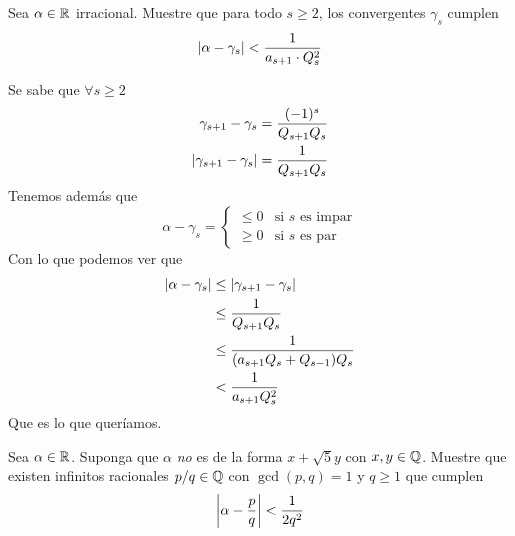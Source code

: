 \begin{prob}[5 pts.]
	Sea $\alpha\in\mathbb{R}$ irracional. Muestre que para todo $s\geq 2$, los convergentes $\gamma_s$ cumplen
	\[
		\left|\alpha-\gamma_s\right|<\frac{1}{a_{s+1}\cdot Q_s^2}
	\]
\end{prob}

\begin{sol}
	Se sabe que $\forall s\geq2$
	\begin{align*}
		\gamma_{s+1}-\gamma_s=\frac{(-1)^s}{Q_{s+1}Q_s} \\
		\left|\gamma_{s+1}-\gamma_s\right|=\frac1{Q_{s+1}Q_s}
	\end{align*}
	Tenemos además que
	\begin{equation*}
		\alpha-\gamma_s=\begin{cases}
			\leq0 & \text{si $s$ es impar} \\
			\geq0 & \text{si $s$ es par}
		\end{cases}
	\end{equation*}
	Con lo que podemos ver que
	\begin{align*}
		\left|\alpha-\gamma_s\right| & \leq\left|\gamma_{s+1}-\gamma_s\right|     \\
		                      & \leq\frac1{Q_{s+1}Q_s}              \\
		                      & \leq\frac1{(a_{s+1}Q_s+Q_{s-1})Q_s} \\
		                      & <\frac1{a_{s+1}Q_s^2}
    \end{align*}
    Que es lo que queríamos.
\end{sol}

\begin{prob}[5 pts.]
	Sea $\alpha\in\mathbb{R}$. Suponga que $\alpha$ \textit{no} es de la forma $x+\sqrt{5}y$ con $x,y\in\mathbb{Q}$. Muestre que existen infinitos racionales $p/q\in\mathbb{Q}$ con $\gcd(p,q)=1$ y $q\geq 1$ que cumplen
	\[
		\left|\alpha-\frac{p}{q}\right|<\frac1{2q^2}
	\]
\end{prob}

